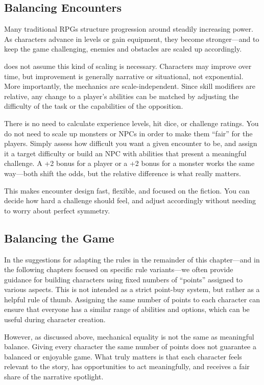 \subsection{Balancing Encounters}

Many traditional RPGs structure progression around steadily increasing power. As characters advance in levels or gain equipment, they become stronger—and to keep the game challenging, enemies and obstacles are scaled up accordingly.

\wyrd does not assume this kind of scaling is necessary. Characters may improve over time, but improvement is generally narrative or situational, not exponential. More importantly, the mechanics are scale-independent. Since skill modifiers are relative, any change to a player’s abilities can be matched by adjusting the difficulty of the task or the capabilities of the opposition.

There is no need to calculate experience levels, hit dice, or challenge ratings. You do not need to scale up monsters or NPCs in order to make them “fair” for the players. Simply assess how difficult you want a given encounter to be, and assign it a target difficulty or build an NPC with abilities that present a meaningful challenge. A +2 bonus for a player or a +2 bonus for a monster works the same way—both shift the odds, but the relative difference is what really matters.

This makes encounter design fast, flexible, and focused on the fiction. You can decide how hard a challenge should feel, and adjust accordingly without needing to worry about perfect symmetry.

\subsection{Balancing the Game}

In the suggestions for adapting the rules in the remainder of this chapter—and in the following chapters focused on specific rule variants—we often provide guidance for building characters using fixed numbers of “points” assigned to various aspects. This is not intended as a strict point-buy system, but rather as a helpful rule of thumb. Assigning the same number of points to each character can ensure that everyone has a similar range of abilities and options, which can be useful during character creation.

However, as discussed above, mechanical equality is not the same as meaningful balance. Giving every character the same number of points does not guarantee a balanced or enjoyable game. What truly matters is that each character feels relevant to the story, has opportunities to act meaningfully, and receives a fair share of the narrative spotlight.

